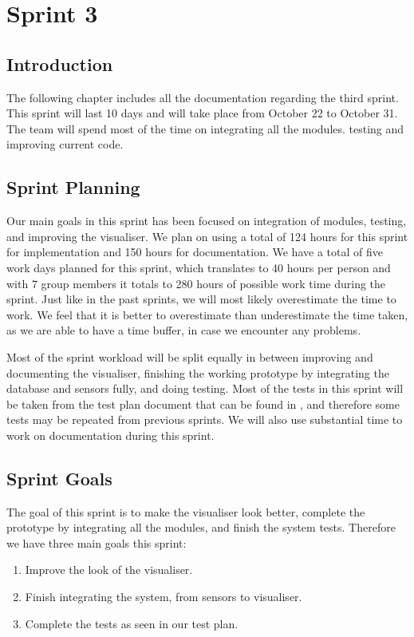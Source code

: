 \documentclass[../document]{subfiles}
\begin{document}
\section{Sprint 3}

\subsection{Introduction}
The following chapter includes all the documentation regarding the third sprint. This sprint will last 10 days and will take place from October 22 to October 31. The team will spend most of the time on integrating all the modules. testing and improving current code.

\subsection{Sprint Planning}
Our main goals in this sprint has been focused on integration of modules, testing, and improving the visualiser. We plan on using a total of 124 hours for this sprint for implementation and 150 hours for documentation. We have a total of five work days planned for this sprint, which translates to 40 hours per person and with 7 group members it totals to 280 hours of possible work time during the sprint. Just like in the past sprints, we will most likely overestimate the time to work. We feel that it is better to overestimate than underestimate the time taken, as we are able to have a time buffer, in case we encounter any problems.

Most of the sprint workload will be split equally in between improving and documenting the visualiser, finishing the working prototype by integrating the database and sensors fully, and doing testing. Most of the tests in this sprint will be taken from the test plan document that can be found in , and therefore some tests may be repeated from previous sprints. We will also use substantial time to work on documentation during this sprint.

\subsection{Sprint Goals}
The goal of this sprint is to make the visualiser look better, complete the prototype by integrating all the modules, and finish the system tests. Therefore we have three main goals this sprint:
\begin{enumerate}
	\item
	Improve the look of the visualiser.
	\item
	Finish integrating the system, from sensors to visualiser.
	\item
	Complete the tests as seen in our test plan.
\end{enumerate}
\end{document}
